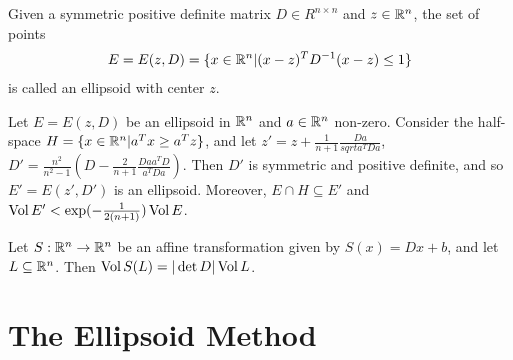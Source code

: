 \begin{defn}
  \label{sec:compl-line-progr-2}
  Given a symmetric positive definite matrix $D \in R^{n \times n}$
  and $z \in \mathbb{R}^{n}$, the set of points
  \begin{align}
    \label{eq:5}
    E = E(z, D) = \{ x \in \mathbb{R}^{n} | (x - z)^{T} D^{-1}(x - z) \leq 1 \}
  \end{align} is called an ellipsoid with center $z$.
\end{defn}

\begin{thm}
  \label{sec:compl-line-progr-3}
  Let $E = E(z, D)$ be an ellipsoid in $\mathbb{R}^{n}$ and $a \in \mathbb{R}^{n}$
  non-zero.  Consider the half-space $H = \{ x \in \mathbb{R}^{n} | a^{T} x
  \geq a^{T}z \} $, and let $z' = z + \frac{1}{n+1}
  \frac{Da}{sqrt{a^{T}Da}}$, $D' = \frac{n^{2}}{n^{2} - 1}(D -
  \frac{2}{n+1}\frac{Daa^{T}D}{a^{T}Da})$.  Then $D'$ is symmetric and
  positive definite, and so $E' = E(z', D')$ is an ellipsoid.
  Moreover, $E \cap H \subseteq E'$ and $\operatorname*{Vol} E' <
  \exp(-\frac{1}{2(n+1)}) \operatorname*{Vol} E$.
\end{thm}

\begin{thm}
  \label{sec:compl-line-progr-4}
  Let $S: \mathbb{R}^{n} \rightarrow \mathbb{R}^{n}$ be an affine transformation given
  by $S(x) = Dx + b$, and let $L \subseteq \mathbb{R}^{n}$.  Then $\operatorname*{Vol} S(L) =
  |\det D| \operatorname*{Vol} L$.
\end{thm}

\section{The Ellipsoid Method}
\label{sec:ellipsoid-method}

